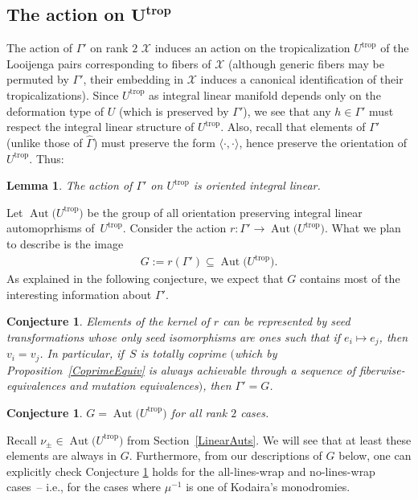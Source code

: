 \documentclass[10pt,a4paper]{amsart}
\numberwithin{equation}{section}
\numberwithin{figure}{section}
\numberwithin{table}{section}
\DeclareMathOperator{\trop}{trop}
\DeclareMathOperator{\Aut}{Aut}
\let\rar=\rightarrow
\let\s=\mathcal
\let\wh=\widehat
\newtheorem{lem}[thm]{Lemma}
\newtheorem{conj}[thm]{Conjecture}
\theoremstyle{definition}
\begin{document}
\subsection[The action on $U^{\trop}$]{The action on $\boldsymbol{U^{\trop}}$}

The action of $\Gamma'$ on rank $2$ $\s{X}$ induces an action on the tropicalization $U^{\trop}$ of the Looijenga pairs corresponding to fibers of $\s{X}$ (although generic fibers may be permuted by $\Gamma'$, their embedding in $\s{X}$ induces a canonical identification of their tropicalizations). Since $U^{\trop}$ as integral linear manifold depends only on the deformation type of $U$ (which is preserved by $\Gamma'$), we see that any $h\in \Gamma'$ must respect the integral linear structure of $U^{\trop}$. Also, recall that elements of $\Gamma'$ (unlike those of $\wh{\Gamma}$) must preserve the form $\langle \cdot,\cdot\rangle$, hence preserve the orientation of $U^{\trop}$. Thus:
\begin{lem}\label{oil}
The action of $\Gamma'$ on $U^{\trop}$ is oriented integral linear.
\end{lem}

Let $\Aut\big(U^{\trop}\big)$ be the group of all orientation preserving integral linear automoprhisms of~$U^{\trop}$. Consider the action $r\colon \Gamma' \rar \Aut\big(U^{\trop}\big)$. What we plan to describe is the image
\begin{gather*}
 G:=r(\Gamma')\subseteq \Aut\big(U^{\trop}\big).
\end{gather*}
As explained in the following conjecture, we expect that $G$ contains most of the interesting information about $\Gamma'$.
\begin{conj}Elements of the kernel of $r$ can be represented by seed transformations whose only seed isomorphisms are ones such that if $e_i\mapsto e_j$, then $v_i=v_j$. In particular, if~$S$ is totally coprime $($which by Proposition~{\rm \ref{CoprimeEquiv}} is always achievable through a sequence of fiberwise-equivalences and mutation equivalences$)$, then $\Gamma'=G$.
\end{conj}

\begin{conj}\label{AutU-Conj}$G=\Aut\big(U^{\trop}\big)$ for all rank $2$ cases.
\end{conj}
Recall $\nu_{\pm}\in\Aut\big(U^{\trop}\big)$ from Section~\ref{LinearAuts}. We will see that at least these elements are always in $G$. Furthermore, from our descriptions of $G$ below, one can explicitly check Conjecture \ref{AutU-Conj} holds for the all-lines-wrap and no-lines-wrap cases~-- i.e., for the cases where $\mu^{-1}$ is one of Kodaira's monodromies.
\end{document}
